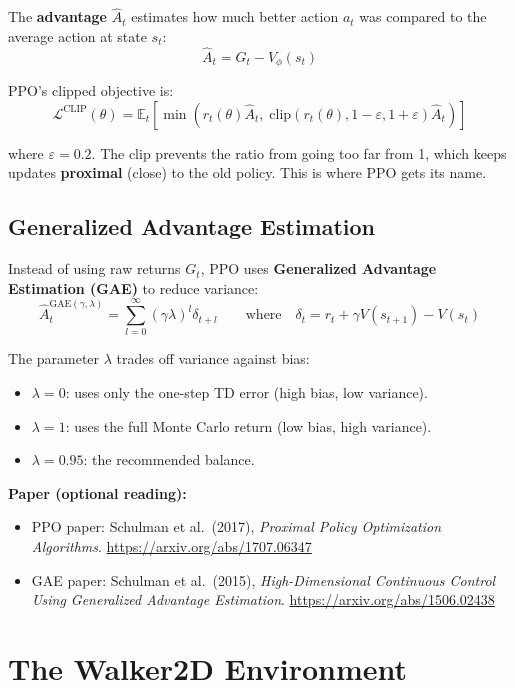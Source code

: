 \documentclass[12pt, a4paper]{article}
\begin{document}
The \textbf{advantage} $\hat{A}_t$ estimates how much better action $a_t$ was compared to the average action at state $s_t$:
\[
\hat{A}_t = G_t - V_\phi(s_t)
\]

PPO's clipped objective is:
\[
\mathcal{L}^{\text{CLIP}}(\theta) = \mathbb{E}_t \left[ \min\!\left( r_t(\theta) \hat{A}_t,\; \text{clip}(r_t(\theta), 1 - \varepsilon, 1 + \varepsilon) \hat{A}_t \right) \right]
\]

where $\varepsilon = 0.2$. The clip prevents the ratio from going too far from 1, which keeps updates \textbf{proximal} (close) to the old policy. This is where PPO gets its name.

\subsection{Generalized Advantage Estimation}

Instead of using raw returns $G_t$, PPO uses \textbf{Generalized Advantage Estimation (GAE)} to reduce variance:
\[
\hat{A}_t^{\text{GAE}(\gamma, \lambda)} = \sum_{l=0}^{\infty} (\gamma \lambda)^l \delta_{t+l}
\qquad \text{where} \quad
\delta_t = r_t + \gamma V(s_{t+1}) - V(s_t)
\]

The parameter $\lambda$ trades off variance against bias:
\begin{itemize}
    \item $\lambda = 0$: uses only the one-step TD error (high bias, low variance).
    \item $\lambda = 1$: uses the full Monte Carlo return (low bias, high variance).
    \item $\lambda = 0.95$: the recommended balance.
\end{itemize}

\textbf{Paper (optional reading):}
\begin{itemize}
    \item PPO paper: Schulman et al.\ (2017), \textit{Proximal Policy Optimization Algorithms}. \url{https://arxiv.org/abs/1707.06347}
    \item GAE paper: Schulman et al.\ (2015), \textit{High-Dimensional Continuous Control Using Generalized Advantage Estimation}. \url{https://arxiv.org/abs/1506.02438}
\end{itemize}

\section{The Walker2D Environment}
\end{document}

